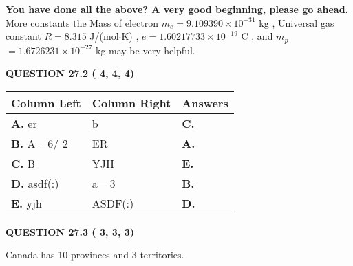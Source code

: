 \documentclass[12pt]{article}
\begin{document}
   
   
\vspace{0.3in}
{\textbf{\LARGE{You have done all the above? A very good beginning, please go ahead.}}}
More constants the
Mass of electron
$m_e$$ =
9.109390 \times 10^{-31} $
kg
,
Universal gas constant
$R$$ =
8.315 $
J/(mol$\cdot $K)
,
$e$$ =
1.60217733 \times 10^{-19} $
C
, and
$m_p$$ =
1.6726231 \times 10^{-27} $
kg
%
may be very helpful.
\vspace{0.3in}
   
   
  
\vspace{0.2in}
  
{\textbf{\Large{QUESTION
27.2 
 (          4,          4,          4)
}}}
  
  
 
 
\noindent{}
  
  
\begin{tabular}{|l|l|l|}
 \hline
 Column Left & Column Right  & Answers       \\ 
 \hline
{\textbf{\large{
A.}}}
er
  & 
b
 & 
{\textbf{\large{
C.}}}
 \\ 
 \hline
{\textbf{\large{
B.}}}
 A= %
6/ %
2

  & 
ER
 & 
{\textbf{\large{
A.}}}
 \\ 
 \hline
{\textbf{\large{
C.}}}
B
  & 
YJH
 & 
{\textbf{\large{
E.}}}
 \\ 
 \hline
{\textbf{\large{
D.}}}
asdf(:)
  & 
 a= %
3
 & 
{\textbf{\large{
B.}}}
 \\ 
 \hline
{\textbf{\large{
E.}}}
yjh
  & 
ASDF(:)
 & 
{\textbf{\large{
D.}}}
 \\ 
 \hline
 \end{tabular}
  
  
 
 
 
 
  
\vspace{0.2in}
  
{\textbf{\Large{QUESTION
27.3 
 (          3,          3,          3)
}}}
  
  
 
 
\noindent{}
 
 
Canada has  %
10 provinces and  %
3 territories.
 
 
 
 
  
\end{document}
